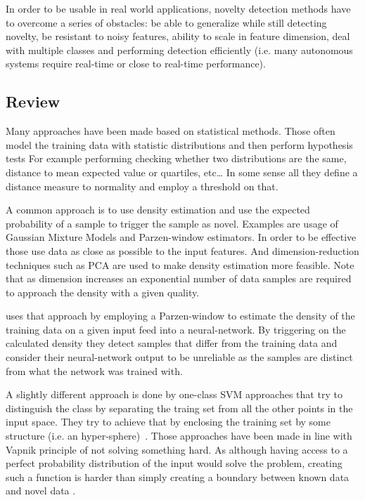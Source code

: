 In order to be usable in real world applications, novelty detection methods
have to overcome a series of obstacles:
be able to generalize while still detecting novelty,
be resistant to noisy features,
ability to scale in feature dimension,
deal with multiple classes and performing detection efficiently (i.e. many
autonomous systems require real-time or close to real-time performance).

\subsection{Review}
Many approaches have been made based on statistical methods. Those often model
the training data with statistic distributions and then perform hypothesis tests
For example performing checking whether two distributions are the same,
distance to mean expected value or quartiles, etc\dots
In some sense all they define a distance measure to normality and employ a
threshold on that.

A common approach is to use density estimation and use the expected probability
of a sample to trigger the sample as novel. Examples are usage of
Gaussian Mixture Models and Parzen-window estimators. In order to be effective
those use data as close as possible to the input features.
And dimension-reduction techniques such as \gls{PCA} are used to make density
estimation more feasible. Note that as dimension increases an exponential number
of data samples are required to approach the density with a given quality.

\cite{bishop1994novelty} uses that approach by employing a Parzen-window to
estimate the density of the training data on a given input feed into a
neural-network. By triggering on the calculated density they detect samples
that differ from the training data and consider their neural-network output
to be unreliable as the samples are distinct from what the network was trained
with.

A slightly different approach is done by one-class \gls{SVM} approaches that
try to distinguish the class by separating the traing set from all the other
points in the input space. They try to achieve that by enclosing the training
set by some structure (i.e. an hyper-sphere)~\cite{bennett2000support}.
Those approaches have been made in line with Vapnik principle of not solving
something hard. As although having access to a perfect probability distribution
of the input would solve the problem, creating such a function is harder than
simply creating a boundary between known data and novel data
\cite{scholkopf2000support}.

